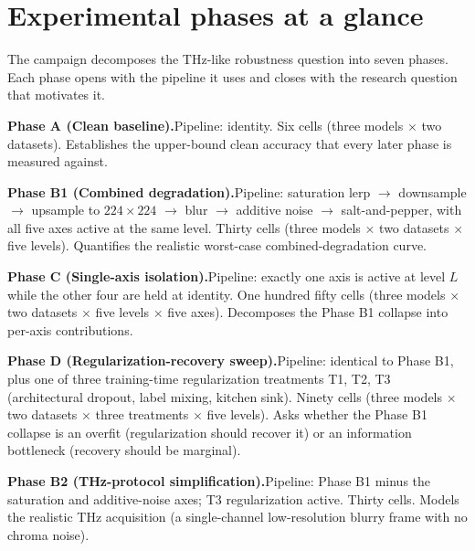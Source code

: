 \section{Experimental phases at a glance}
\label{sec:phases}

The campaign decomposes the THz-like robustness question into seven
phases. Each phase opens with the pipeline it uses and closes with the
research question that motivates it.

\textbf{Phase A (Clean baseline).}\quad Pipeline: identity. Six cells
(three models $\times$ two datasets). Establishes the upper-bound
clean accuracy that every later phase is measured against.

\textbf{Phase B1 (Combined degradation).}\quad Pipeline: saturation lerp
$\rightarrow$ downsample $\rightarrow$ upsample to $224 \times 224$
$\rightarrow$ blur $\rightarrow$ additive noise $\rightarrow$
salt-and-pepper, with all five axes active at the same level. Thirty
cells (three models $\times$ two datasets $\times$ five levels).
Quantifies the realistic worst-case combined-degradation curve.

\textbf{Phase C (Single-axis isolation).}\quad Pipeline: exactly one
axis is active at level $L$ while the other four are held at identity.
One hundred fifty cells (three models $\times$ two datasets $\times$
five levels $\times$ five axes). Decomposes the Phase B1 collapse into
per-axis contributions.

\textbf{Phase D (Regularization-recovery sweep).}\quad Pipeline:
identical to Phase B1, plus one of three training-time regularization
treatments T1, T2, T3 (architectural dropout, label mixing, kitchen
sink). Ninety cells (three models $\times$ two datasets $\times$ three
treatments $\times$ five levels). Asks whether the Phase B1 collapse
is an overfit (regularization should recover it) or an information
bottleneck (recovery should be marginal).

\textbf{Phase B2 (THz-protocol simplification).}\quad Pipeline: Phase
B1 minus the saturation and additive-noise axes; T3 regularization
active. Thirty cells. Models the realistic THz acquisition (a
single-channel low-resolution blurry frame with no chroma noise).

